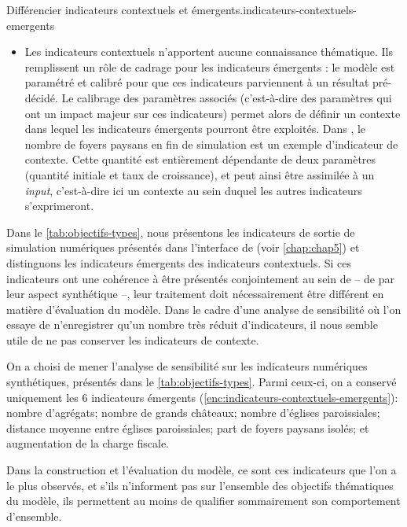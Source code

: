 \begin{encadre}{Différencier indicateurs contextuels et émergents.}{indicateurs-contextuels-emergents}
\begin{itemize}
	\item Les indicateurs contextuels n'apportent aucune connaissance thématique.
	Ils remplissent un rôle de cadrage pour les indicateurs émergents : le modèle est paramétré et calibré pour que ces indicateurs parviennent à un résultat pré-décidé.
	Le calibrage des paramètres associés (c'est-à-dire des paramètres qui ont un impact majeur sur ces indicateurs) permet alors de définir un contexte dans lequel les indicateurs émergents pourront être exploités.
	Dans \simfeodal{}, le nombre de foyers paysans en fin de simulation est un exemple d'indicateur de contexte.
	Cette quantité est entièrement dépendante de deux paramètres (quantité initiale et taux de croissance), et peut ainsi être assimilée à un \textit{input}, c'est-à-dire ici un contexte au sein duquel les autres indicateurs s'exprimeront.
\end{itemize}

Dans le \cref{tab:objectifs-types}, nous présentons les indicateurs de sortie de simulation numériques présentés dans l'interface de \simedb{} (voir \cref{chap:chap5}) et distinguons les indicateurs émergents des indicateurs contextuels.
Si ces indicateurs ont une cohérence à être présentés conjointement au sein de \simedb{} -- de par leur aspect synthétique --, leur traitement doit nécessairement être différent en matière d'évaluation du modèle.
Dans le cadre d'une analyse de sensibilité où l'on essaye de n'enregistrer qu'un nombre très réduit d'indicateurs, il nous semble utile de ne pas conserver les indicateurs \og de contexte\fg{}.


\medskip
\end{encadre}

On a choisi de mener l'analyse de sensibilité sur les indicateurs numériques synthétiques, présentés dans le \cref{tab:objectifs-types}.
Parmi ceux-ci, on a conservé uniquement les 6 indicateurs \og émergents\fg{} (\cref{enc:indicateurs-contextuels-emergents}): 
nombre d'agrégats; nombre de grands châteaux; nombre d'églises paroissiales; distance moyenne entre églises paroissiales; part de foyers paysans isolés; et augmentation de la charge fiscale.
	
Dans la construction et l'évaluation du modèle, ce sont ces indicateurs que l'on a le plus observés, et s'ils n'informent pas sur l'ensemble des objectifs thématiques du modèle, ils permettent au moins de qualifier sommairement son comportement d'ensemble.

